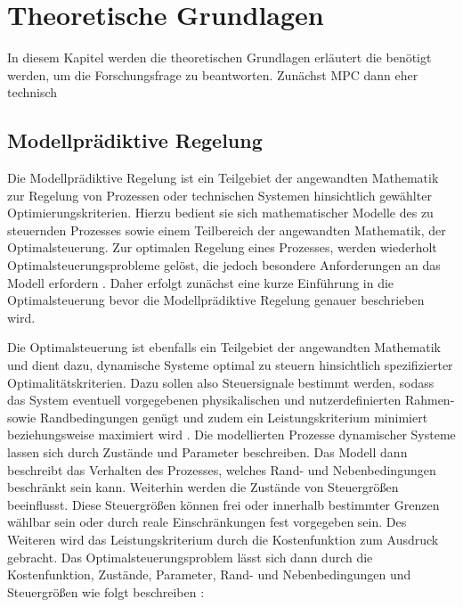 \renewcommand{\chapterheadstartvskip}{\vspace*{2cm}}

\chapter{Theoretische Grundlagen}
\label{chap:theoretischegrundlagen}

In diesem Kapitel werden die theoretischen Grundlagen erläutert die benötigt werden, um die Forschungsfrage zu beantworten.
Zunächst MPC dann eher technisch

\section{Modellprädiktive Regelung}
\label{chap:mpc}

Die Modellprädiktive Regelung ist ein Teilgebiet der angewandten Mathematik zur Regelung von Prozessen oder technischen Systemen hinsichtlich gewählter Optimierungskriterien. Hierzu bedient sie sich mathematischer Modelle des zu steuernden Prozesses sowie einem Teilbereich der angewandten Mathematik, der Optimalsteuerung. Zur optimalen Regelung eines Prozesses, werden wiederholt Optimalsteuerungsprobleme gelöst, die jedoch besondere Anforderungen an das Modell erfordern \cite[S.~10]{di14}. Daher erfolgt zunächst eine kurze Einführung in die Optimalsteuerung bevor die Modellprädiktive Regelung genauer beschrieben wird.

Die Optimalsteuerung ist ebenfalls ein Teilgebiet der angewandten Mathematik und dient dazu, dynamische Systeme optimal zu steuern hinsichtlich spezifizierter Optimalitätskriterien. Dazu sollen also Steuersignale bestimmt werden, sodass das System eventuell vorgegebenen physikalischen und nutzerdefinierten Rahmen- sowie Randbedingungen genügt und zudem ein Leistungskriterium minimiert beziehungsweise maximiert wird \cite[S.~3f.]{ki04}.
Die modellierten Prozesse dynamischer Systeme lassen sich durch Zustände und Parameter beschreiben. Das Modell dann beschreibt das Verhalten des Prozesses, welches Rand- und Nebenbedingungen beschränkt sein kann. Weiterhin werden die Zustände von Steuergrößen beeinflusst. Diese Steuergrößen können frei oder innerhalb bestimmter Grenzen wählbar sein oder durch reale Einschränkungen fest vorgegeben sein. Des Weiteren wird das Leistungskriterium durch die Kostenfunktion zum Ausdruck gebracht. Das Optimalsteuerungsproblem lässt sich dann durch die Kostenfunktion, Zustände, Parameter, Rand- und Nebenbedingungen und Steuergrößen wie folgt beschreiben \cite[S.~61]{di14}:

